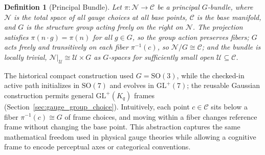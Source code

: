 \documentclass[11pt]{article}
\newtheorem{definition}{Definition}
\begin{document}
\begin{definition}[Principal Bundle]
Let $\pi: \mathcal{N} \to \mathcal{C}$ be a principal $G$-bundle, where $\mathcal{N}$ is the total space of all gauge choices at all base points, $\mathcal{C}$ is the base manifold, and $G$ is the structure group acting freely on the right on $\mathcal{N}$. The projection satisfies $\pi(n \cdot g) = \pi(n)$ for all $g \in G$, so the group action preserves fibers; $G$ acts freely and transitively on each fiber $\pi^{-1}(c)$, so $\mathcal{N}/G \cong \mathcal{C}$; and the bundle is locally trivial, $\mathcal{N}|_{\mathcal{U}} \cong \mathcal{U} \times G$ as $G$-spaces for sufficiently small open $\mathcal{U} \subseteq \mathcal{C}$.
\end{definition}

The historical compact construction used $G=\mathrm{SO}(3)$, while the checked-in active path initializes in $\mathrm{SO}(7)$ and evolves in $\mathrm{GL}^+(7)$; the reusable Gaussian construction permits general $\mathrm{GL}^+(K_q)$ frames (Section~\ref{sec:gauge_group_choice}). Intuitively, each point $c\in\mathcal{C}$ sits below a fiber $\pi^{-1}(c)\cong G$ of frame choices, and moving within a fiber changes reference frame without changing the base point. This abstraction captures the same mathematical freedom used in physical gauge theories while allowing a cognitive frame to encode perceptual axes or categorical conventions.
\end{document}
